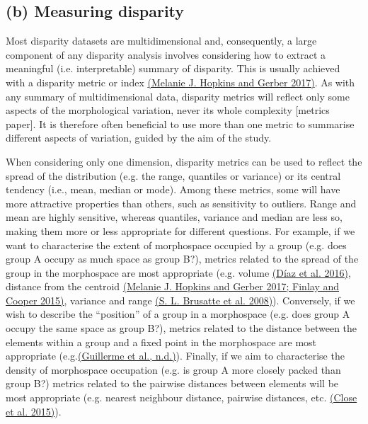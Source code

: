 \hypertarget{b-disparity-indices}{%
\subsection{(b) Measuring disparity}\label{c-disparity-indices}}

Most disparity datasets are multidimensional and, consequently, a large
component of any disparity analysis involves considering how to extract
a meaningful (i.e. interpretable) summary of disparity. This is usually
achieved with a disparity metric or index
\href{https://paperpile.com/c/sTGYvp/vTHS}{(Melanie J. Hopkins and
Gerber 2017)}. As with any summary of multidimensional data, disparity
metrics will reflect only some aspects of the morphological variation,
never its whole complexity {[}metrics paper{]}. It is therefore often
beneficial to use more than one metric to summarise different aspects of
variation, guided by the aim of the study.

When considering only one dimension, disparity metrics can be used to
reflect the spread of the distribution (e.g. the range, quantiles or
variance) or its central tendency (i.e., mean, median or mode). Among
these metrics, some will have more attractive properties than others,
such as sensitivity to outliers. Range and mean are highly sensitive,
whereas quantiles, variance and median are less so, making them more or
less appropriate for different questions. For example, if we want to
characterise the extent of morphospace occupied by a group (e.g. does
group A occupy as much space as group B?), metrics related to the spread
of the group in the morphospace are most appropriate (e.g. volume
\href{https://paperpile.com/c/sTGYvp/47fI}{(Díaz et al. 2016)}, distance
from the centroid
\href{https://paperpile.com/c/sTGYvp/vTHS+yyNa}{(Melanie J. Hopkins and
Gerber 2017; Finlay and Cooper 2015)}, variance and range
\href{https://paperpile.com/c/sTGYvp/tGyd}{(S. L. Brusatte et al.
2008)}). Conversely, if we wish to describe the ``position'' of a group
in a morphospace (e.g. does group A occupy the same space as group B?),
metrics related to the distance between the elements within a group and
a fixed point in the morphospace are most appropriate
(e.g.\href{https://paperpile.com/c/sTGYvp/u1KE}{(Guillerme et al.,
n.d.)}). Finally, if we aim to characterise the density of morphospace
occupation (e.g. is group A more closely packed than group B?) metrics
related to the pairwise distances between elements will be most
appropriate (e.g. nearest neighbour distance, pairwise distances, etc.
\href{https://paperpile.com/c/sTGYvp/PbSx}{(Close et al. 2015)}).

